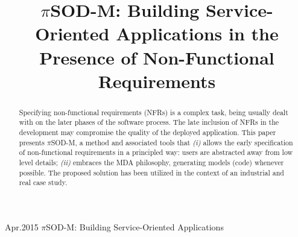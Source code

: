 \documentclass[12pt,twoside]{article}
\theoremstyle{plain}
\theoremstyle{plain}
\newcommand{\pisodm}[0]{$\pi$SOD-M\xspace}
\begin{document}
\setcounter{page}{1}

\setpageinformation
{}
{ }{ }{}{Apr.}{2015}
{\pisodm: Building Service-Oriented Applications}


\title{\pisodm: Building Service-Oriented Applications in the Presence of Non-Functional Requirements}






\begin{abstract}
Specifying non-functional requirements (NFRs) is a complex task, being usually dealt with on the later phases of the software process.
The late inclusion of NFRs in the development may compromise the quality of the deployed application.
This paper presents \pisodm, a method and associated tools that
\textit{(i)}  allows the early specification of non-functional requirements in a principled way: users are abstracted away from low level details;
\textit{(ii)} embraces the MDA philosophy, generating models (code) whenever possible.
The pro\-po\-sed solution has been utilized in the context of an industrial and real case study.
\end{abstract}
\end{document}
